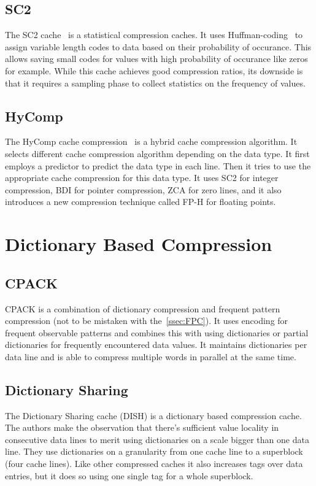 \subsection{SC2}
The SC2 cache~\cite{sc2} is a statistical compression caches. It uses Huffman-coding~\cite{huffman1952method} to assign variable length codes to data based on their probability of occurance. This allows saving small codes for values with high probability of occurance like zeros for example. While this cache achieves good compression ratios, its downside is that it requires a sampling phase to collect statistics on the frequency of values.
\subsection{HyComp}
The HyComp cache compression~\cite{hycomp} is a hybrid cache compression algorithm. It selects different cache compression algorithm depending on the data type. It first employs a predictor to predict the data type in each line. Then it tries to use the appropriate cache compression for this data type. It uses SC2 for integer compression, BDI for pointer compression, ZCA for zero lines, and it also introduces a new compression technique called FP-H for floating points.

\section{Dictionary Based Compression}
\subsection{CPACK}
CPACK is a combination of dictionary compression and frequent pattern compression (not to be mistaken with the~\ref{ssec:FPC}). It uses encoding for frequent observable patterns and combines this with using dictionaries or partial dictionaries for frequently encountered data values. It maintains dictionaries per data line and is able to compress multiple words in parallel at the same time.
\subsection{Dictionary Sharing}
The Dictionary Sharing cache (DISH) is a dictionary based compression cache. The authors make the observation that there's sufficient value locality in consecutive data lines to merit using dictionaries on a scale bigger than one data line. They use dictionaries on a granularity from one cache line to a superblock (four cache lines). Like other compressed caches it also increases tags over data entries, but it does so using one single tag for a whole superblock.

